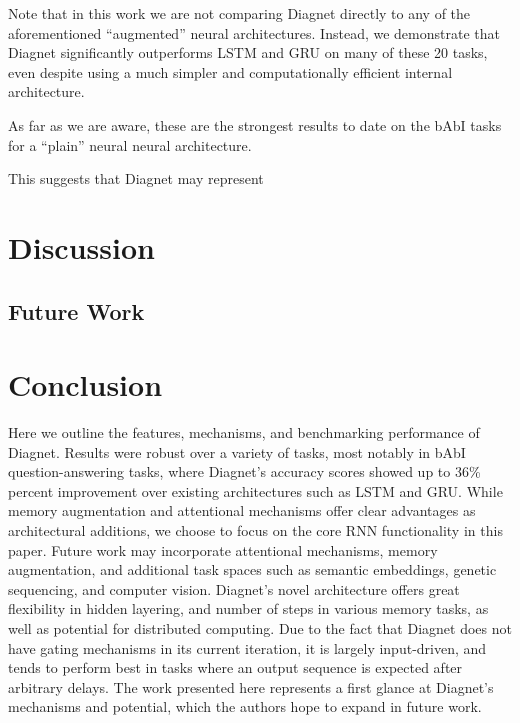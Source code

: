 \documentclass{article}
\begin{document}
Note that in this work we are not comparing Diagnet directly to any of the aforementioned “augmented” neural architectures. Instead, we demonstrate that Diagnet significantly outperforms LSTM and GRU on many of these 20 tasks, even despite using a much simpler and computationally efficient internal architecture.

As far as we are aware, these are the strongest results to date on the bAbI tasks for a “plain” neural neural architecture.

This suggests that Diagnet may represent 

\section{Discussion}
\subsection{Future Work}
\section{Conclusion}
Here we outline the features, mechanisms, and benchmarking performance of Diagnet. Results were robust over a variety of tasks, most notably in bAbI question-answering tasks, where Diagnet’s accuracy scores showed up to 36\% percent improvement over existing architectures such as LSTM and GRU.  While memory augmentation and attentional mechanisms offer clear advantages as architectural additions, we choose to focus on the core RNN functionality in this paper.  Future work may incorporate attentional mechanisms, memory augmentation, and additional task spaces such as semantic embeddings, genetic sequencing, and computer vision.  Diagnet’s novel architecture offers great flexibility in hidden layering, and number of steps in various memory tasks, as well as potential for distributed computing.  Due to the fact that Diagnet does not have gating mechanisms in its current iteration, it is largely input-driven, and tends to perform best in tasks where an output sequence is expected after arbitrary delays. The work presented here represents a first glance at Diagnet’s mechanisms and potential, which the authors hope to expand in future work. 


\end{document}
